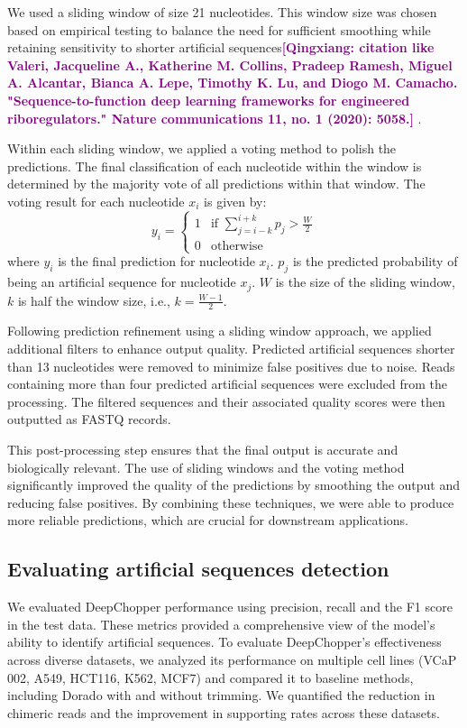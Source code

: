 \documentclass[pdflatex, sn-mathphys-num, lineno]{sn-jnl}%
\newcommand{\qx}[1]{\textcolor{purple}{\textbf{[Qingxiang: #1]}}}
\theoremstyle{thmstyleone}%
\theoremstyle{thmstyletwo}%
\theoremstyle{thmstylethree}%
\begin{document}
We used a sliding window of size 21 nucleotides.
This window size was chosen based on empirical testing to balance the need for sufficient smoothing while retaining sensitivity to shorter artificial sequences\qx{citation like Valeri, Jacqueline A., Katherine M. Collins, Pradeep Ramesh, Miguel A. Alcantar, Bianca A. Lepe, Timothy K. Lu, and Diogo M. Camacho. "Sequence-to-function deep learning frameworks for engineered riboregulators." Nature communications 11, no. 1 (2020): 5058.} .

Within each sliding window, we applied a voting method to polish the predictions.
The final classification of each nucleotide within the window is determined by the majority vote of all predictions within that window.
The voting result for each nucleotide \( x_i \) is given by:
\[
	y_i = \begin{cases}
		1 & \text{if } \sum_{j=i-k}^{i+k} p_j > \frac{W}{2} \\
		0 & \text{otherwise}
	\end{cases}
\]
where \( y_i \) is the final prediction for nucleotide \( x_i \). \( p_j \) is the predicted probability of being an artificial sequence for nucleotide \( x_j \). \( W \) is the size of the sliding window, \( k \) is half the window size, i.e., \( k = \frac{W-1}{2} \).

Following prediction refinement using a sliding window approach, we applied additional filters to enhance output quality.
Predicted artificial sequences shorter than 13 nucleotides were removed to minimize false positives due to noise.
Reads containing more than four predicted artificial sequences were excluded from the processing.
The filtered sequences and their associated quality scores were then outputted as FASTQ records.

This post-processing step ensures that the final output is accurate and biologically relevant.
The use of sliding windows and the voting method significantly improved the quality of the predictions by smoothing the output and reducing false positives.
By combining these techniques, we were able to produce more reliable predictions, which are crucial for downstream applications.


\subsection{Evaluating artificial sequences detection}

We evaluated DeepChopper performance using precision, recall and the F1 score in the test data.
These metrics provided a comprehensive view of the model's ability to identify artificial sequences.
To evaluate DeepChopper's effectiveness across diverse datasets, we analyzed its performance on multiple cell lines (VCaP 002, A549, HCT116, K562, MCF7) and compared it to baseline methods, including Dorado with and without trimming.
We quantified the reduction in chimeric reads and the improvement in supporting rates across these datasets.
\end{document}
